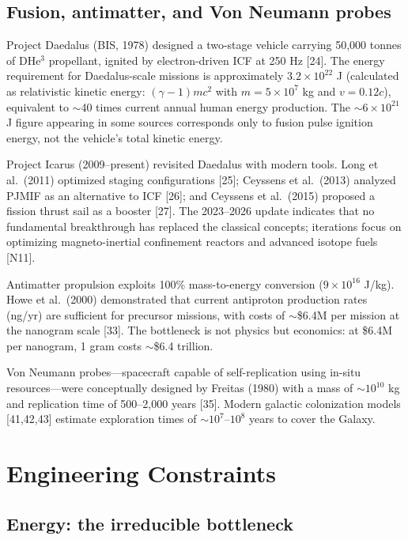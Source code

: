 \documentclass[11pt,a4paper,onecolumn]{article}
\begin{document}
\subsection{Fusion, antimatter, and Von Neumann probes}

Project Daedalus (BIS, 1978) designed a two-stage vehicle carrying 50,000 tonnes of DHe$^3$ propellant, ignited by electron-driven ICF at 250 Hz [24]. The energy requirement for Daedalus-scale missions is approximately $3.2\times10^{22}$ J (calculated as relativistic kinetic energy: $(\gamma-1)mc^2$ with $m = 5\times10^7$ kg and $v = 0.12c$), equivalent to $\sim$40 times current annual human energy production. The $\sim6\times10^{21}$ J figure appearing in some sources corresponds only to fusion pulse ignition energy, not the vehicle's total kinetic energy.

Project Icarus (2009--present) revisited Daedalus with modern tools. Long et al.\ (2011) optimized staging configurations [25]; Ceyssens et al.\ (2013) analyzed PJMIF as an alternative to ICF [26]; and Ceyssens et al.\ (2015) proposed a fission thrust sail as a booster [27]. The 2023--2026 update indicates that no fundamental breakthrough has replaced the classical concepts; iterations focus on optimizing magneto-inertial confinement reactors and advanced isotope fuels [N11].

Antimatter propulsion exploits 100\% mass-to-energy conversion ($9\times10^{16}$ J/kg). Howe et al.\ (2000) demonstrated that current antiproton production rates (ng/yr) are sufficient for precursor missions, with costs of $\sim$\$6.4M per mission at the nanogram scale [33]. The bottleneck is not physics but economics: at \$6.4M per nanogram, 1 gram costs $\sim$\$6.4 trillion.

Von Neumann probes---spacecraft capable of self-replication using in-situ resources---were conceptually designed by Freitas (1980) with a mass of $\sim10^{10}$ kg and replication time of 500--2,000 years [35]. Modern galactic colonization models [41,42,43] estimate exploration times of $\sim10^7$--$10^8$ years to cover the Galaxy.

\section{Engineering Constraints}

\subsection{Energy: the irreducible bottleneck}
\end{document}
